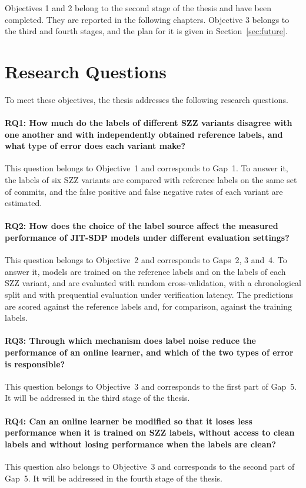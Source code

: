 \documentclass[12pt,a4paper,oneside]{report}
\begin{document}
Objectives 1 and 2 belong to the second stage of the thesis and have been
completed. They are reported in the following chapters. Objective 3 belongs
to the third and fourth stages, and the plan for it is given in
Section~\ref{sec:future}.

\section{Research Questions}

To meet these objectives, the thesis addresses the following research
questions.

\paragraph{RQ1: How much do the labels of different SZZ variants disagree with one
another and with independently obtained reference labels, and what type of
error does each variant make?}
This question belongs to Objective~1 and corresponds to Gap~1. To answer it,
the labels of six SZZ variants are compared with reference labels on the same
set of commits, and the false positive and false negative rates of each
variant are estimated.

\paragraph{RQ2: How does the choice of the label source affect the measured
performance of JIT-SDP models under different evaluation settings?}
This question belongs to Objective~2 and corresponds to Gaps~2, 3 and~4. To
answer it, models are trained on the reference labels and on the labels of
each SZZ variant, and are evaluated with random cross-validation, with a
chronological split and with prequential evaluation under verification
latency. The predictions are scored against the reference labels and, for
comparison, against the training labels.

\paragraph{RQ3: Through which mechanism does label noise reduce the performance of
an online learner, and which of the two types of error is responsible?}
This question belongs to Objective~3 and corresponds to the first part of
Gap~5. It will be addressed in the third stage of the thesis.

\paragraph{RQ4: Can an online learner be modified so that it loses less
performance when it is trained on SZZ labels, without access to clean labels
and without losing performance when the labels are clean?}
This question also belongs to Objective~3 and corresponds to the second part
of Gap~5. It will be addressed in the fourth stage of the thesis.
\end{document}
